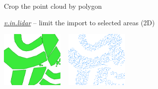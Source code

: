 \documentclass[xcolor={dvipsnames,usenames},beamer,aspectratio=169]{beamer}
\newcommand{\gmodule}[1]{\href{http://grass.osgeo.org/grass71/manuals/#1.html}{\emph{#1}}}
\begin{document}
\begin{frame}{Crop the point cloud by polygon}

\gmodule{v.in.lidar} -- limit the import to selected areas (2D)

\bigskip
\bigskip

\centering
\begin{minipage}{0.96\textwidth}
\centering
%
\newcommand{\imgsize}{0.23\textwidth}
\includegraphics[width=\imgsize]{features/areas}%
~%
\includegraphics[width=\imgsize]{features/selected_1}%

\end{minipage}
\end{frame}
\end{document}
